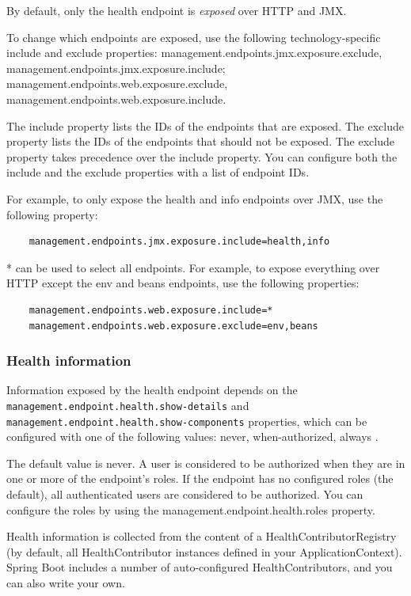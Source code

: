 \documentclass{scrartcl}
\begin{document}
By default, only the health endpoint is \textit{exposed} over HTTP and JMX.

To change which endpoints are exposed, use the following technology-specific include and exclude properties: management.endpoints.jmx.exposure.exclude,
management.endpoints.jmx.exposure.include; management.endpoints.web.exposure.exclude, management.endpoints.web.exposure.include.

The include property lists the IDs of the endpoints that are exposed. The exclude property lists the IDs of the endpoints that should not be exposed. The exclude property takes precedence over the include property. You can configure both the include and the exclude properties with a list of endpoint IDs.

For example, to only expose the health and info endpoints over JMX, use the following property:

\begin{lstlisting}
    management.endpoints.jmx.exposure.include=health,info
\end{lstlisting}

* can be used to select all endpoints. For example, to expose everything over HTTP except the env and beans endpoints, use the following properties:

\begin{lstlisting}
    management.endpoints.web.exposure.include=*
    management.endpoints.web.exposure.exclude=env,beans

\end{lstlisting}

\subsubsection{Health information}

Information exposed by the health endpoint depends on the \lstinline|management.endpoint.health.show-details| and \lstinline|management.endpoint.health.show-components| properties, which can be configured with one of the following values: never, when-authorized, always
.

The default value is never. A user is considered to be authorized when they are in one or more of the endpoint’s roles. If the endpoint has no configured roles (the default), all authenticated users are considered to be authorized. You can configure the roles by using the management.endpoint.health.roles property.

Health information is collected from the content of a HealthContributorRegistry (by default, all HealthContributor instances defined in your ApplicationContext). Spring Boot includes a number of auto-configured HealthContributors, and you can also write your own.
\end{document}
